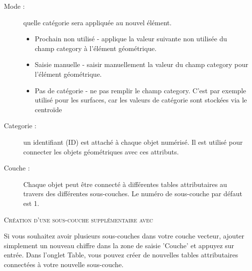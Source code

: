 {\begin{description}
\item[Mode :]quelle catégorie sera appliquée au nouvel élément.
\begin{itemize}[label=--]
\item Prochain non utilisé - applique la valeur suivante non utilisée du champ category à l'élément géométrique.
\item Saisie manuelle - saisir manuellement la valeur du champ category pour l'élément géométrique.
\item Pas de catégorie - ne pas remplir le champ category. C'est par exemple utilisé pour les surfaces, car les valeurs de catégorie sont stockées via le centroïde
\end{itemize}
\item[Categorie :]un identifiant (ID) est attaché à chaque objet numérisé. Il est utilisé pour connecter les objets géométriques avec ces attributs.
\item[Couche :]Chaque objet peut être connecté à différentes tables attributaires au travers des différentes sous-couches. Le numéro de sous-couche par défaut est 1.
\end{description}

\begin{Tip}\caption{\textsc{Création d'une sous-couche supplémentaire avec \qg}}
Si vous souhaitez avoir plusieurs sous-couches dans votre couche vecteur, ajouter simplement un nouveau chiffre dans la zone de saisie 'Couche' et appuyez sur entrée. Dans l'onglet Table, vous pouvez créer de nouvelles tables attributaires connectées à votre nouvelle sous-couche.
\end{Tip}

}
